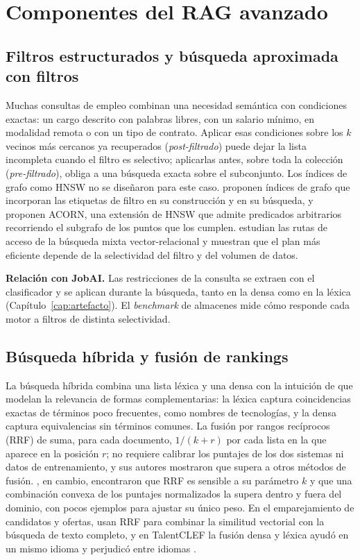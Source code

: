 \section{Componentes del RAG avanzado}
\label{sec:estado-arte-componentes}

\subsection{Filtros estructurados y búsqueda aproximada con filtros}

Muchas consultas de empleo combinan una necesidad semántica con condiciones exactas: un cargo descrito con palabras libres, con un salario mínimo, en modalidad remota o con un tipo de contrato. Aplicar esas condiciones sobre los $k$ vecinos más cercanos ya recuperados (\emph{post-filtrado}) puede dejar la lista incompleta cuando el filtro es selectivo; aplicarlas antes, sobre toda la colección (\emph{pre-filtrado}), obliga a una búsqueda exacta sobre el subconjunto. Los índices de grafo como HNSW no se diseñaron para este caso. \citet{Gollapudi2023} proponen índices de grafo que incorporan las etiquetas de filtro en su construcción y en su búsqueda, y \citet{Patel2024} proponen ACORN, una extensión de HNSW que admite predicados arbitrarios recorriendo el subgrafo de los puntos que los cumplen. \citet{Sanca2024} estudian las rutas de acceso de la búsqueda mixta vector-relacional y muestran que el plan más eficiente depende de la selectividad del filtro y del volumen de datos.

\textbf{Relación con JobAI.} Las restricciones de la consulta se extraen con el clasificador y se aplican durante la búsqueda, tanto en la densa como en la léxica (Capítulo~\ref{cap:artefacto}). El \textit{benchmark} de almacenes mide cómo responde cada motor a filtros de distinta selectividad.

\subsection{Búsqueda híbrida y fusión de rankings}

La búsqueda híbrida combina una lista léxica y una densa con la intuición de que modelan la relevancia de formas complementarias: la léxica captura coincidencias exactas de términos poco frecuentes, como nombres de tecnologías, y la densa captura equivalencias sin términos comunes. La fusión por rangos recíprocos (RRF) de \citet{Cormack2009} suma, para cada documento, $1/(k + r)$ por cada lista en la que aparece en la posición $r$; no requiere calibrar los puntajes de los dos sistemas ni datos de entrenamiento, y sus autores mostraron que supera a otros métodos de fusión. \citet{Bruch2023}, en cambio, encontraron que RRF es sensible a su parámetro $k$ y que una combinación convexa de los puntajes normalizados la supera dentro y fuera del dominio, con pocos ejemplos para ajustar su único peso. En el emparejamiento de candidatos y ofertas, \citet{Yashwant2026} usan RRF para combinar la similitud vectorial con la búsqueda de texto completo, y en TalentCLEF la fusión densa y léxica ayudó en un mismo idioma y perjudicó entre idiomas \citep{Thuma2026}.

